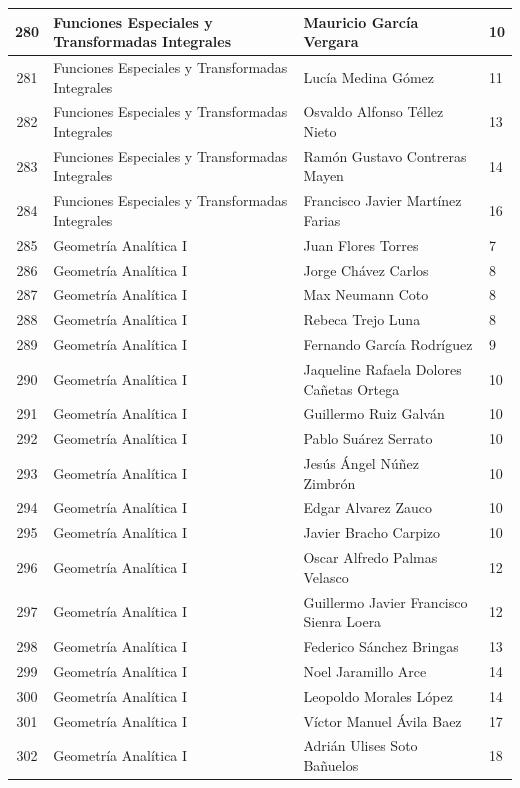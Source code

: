 {\begin{longtable}{|c|p{6.5cm}|p{5cm}|p{1.5cm}|}
  280 & Funciones Especiales y Transformadas Integrales & Mauricio García Vergara & 10 \\ \hline
  281 & Funciones Especiales y Transformadas Integrales & Lucía Medina Gómez & 11 \\ \hline
  282 & Funciones Especiales y Transformadas Integrales & Osvaldo Alfonso Téllez Nieto & 13 \\ \hline
  283 & Funciones Especiales y Transformadas Integrales & Ramón Gustavo Contreras Mayen & 14 \\ \hline
  284 & Funciones Especiales y Transformadas Integrales & Francisco Javier Martínez Farias & 16 \\ \hline
  285 & Geometría Analítica I & Juan Flores Torres & 7 \\ \hline
  286 & Geometría Analítica I & Jorge Chávez Carlos & 8 \\ \hline
  287 & Geometría Analítica I & Max Neumann Coto & 8 \\ \hline
  288 & Geometría Analítica I & Rebeca Trejo Luna & 8 \\ \hline
  289 & Geometría Analítica I & Fernando García Rodríguez & 9 \\ \hline
  290 & Geometría Analítica I & Jaqueline Rafaela Dolores Cañetas Ortega & 10 \\ \hline
  291 & Geometría Analítica I & Guillermo Ruiz Galván & 10 \\ \hline
  292 & Geometría Analítica I & Pablo Suárez Serrato & 10 \\ \hline
  293 & Geometría Analítica I & Jesús Ángel Núñez Zimbrón & 10 \\ \hline
  294 & Geometría Analítica I & Edgar Alvarez Zauco & 10 \\ \hline
  295 & Geometría Analítica I & Javier Bracho Carpizo & 10 \\ \hline
  296 & Geometría Analítica I & Oscar Alfredo Palmas Velasco & 12 \\ \hline
  297 & Geometría Analítica I & Guillermo Javier Francisco Sienra Loera & 12 \\ \hline
  298 & Geometría Analítica I & Federico Sánchez Bringas & 13 \\ \hline
  299 & Geometría Analítica I & Noel Jaramillo Arce & 14 \\ \hline
  300 & Geometría Analítica I & Leopoldo Morales López & 14 \\ \hline
  301 & Geometría Analítica I & Víctor Manuel Ávila Baez & 17 \\ \hline
  302 & Geometría Analítica I & Adrián Ulises Soto Bañuelos & 18 \\ \hline

\end{longtable}}
